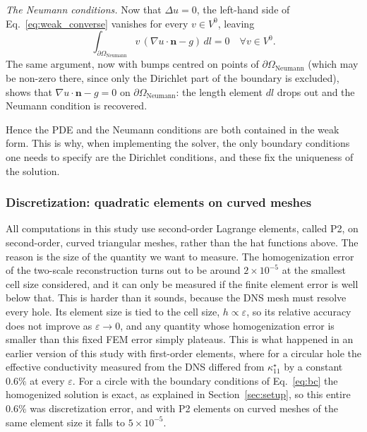 \documentclass{article}
\makeatletter
\providecommand\FloatBarrier{\par\begingroup\let\@elt\relax
  \edef\@tempa{\@botlist\@deferlist\@dbldeferlist}%
  \ifx\@tempa\@empty\else\clearpage\fi\endgroup}
\newcommand{\tmop}[1]{\ensuremath{\operatorname{#1}}}
\makeatother
\begin{document}
\emph{The Neumann conditions.} Now that $\Delta u = 0$, the left-hand side of
Eq.~\eqref{eq:weak_converse} vanishes for every $v \in V^0$, leaving
\[ \int_{\partial \Omega_{\tmop{Neumann}}} v \, (\nabla u \cdot \mathbf{n} - g) \,
   dl = 0 \quad \forall v \in V^0 . \]
The same argument, now with bumps centred on points of $\partial
\Omega_{\tmop{Neumann}}$ (which may be non-zero there, since only the Dirichlet
part of the boundary is excluded), shows that $\nabla u \cdot \mathbf{n} - g = 0$
on $\partial \Omega_{\tmop{Neumann}}$: the length element $dl$ drops out and the
Neumann condition is recovered.

Hence the PDE and the Neumann conditions are both contained in the weak form.
This is why, when implementing the solver, the only boundary conditions one
needs to specify are the Dirichlet conditions, and these fix the uniqueness of
the solution.

\FloatBarrier
\subsubsection{Discretization: quadratic elements on curved meshes}
\label{sec:p2}

All computations in this study use second-order Lagrange elements, called P2, on
second-order, curved triangular meshes, rather than the hat functions above.
The reason is the size of the quantity we want to measure. The homogenization
error of the two-scale reconstruction turns out to be around $2\times10^{-5}$ at
the smallest cell size considered, and it can only be measured if the finite element
error is well below that. This is harder than it sounds, because the DNS mesh must
resolve every hole. Its element size is tied to the cell size, $h \propto \varepsilon$,
so its relative accuracy does not improve as $\varepsilon \to 0$, and any quantity whose
homogenization error is smaller than this fixed FEM error simply plateaus. This is what
happened in an earlier version of this study with first-order elements, where for a
circular hole the effective conductivity measured from the DNS differed from
$\kappa^{\star}_{11}$ by a constant $0.6\%$ at every $\varepsilon$. For a circle with the
boundary conditions of Eq.~\eqref{eq:bc} the homogenized solution is exact, as explained
in Section~\ref{sec:setup}, so this entire $0.6\%$ was discretization error, and with P2
elements on curved meshes of the same element size it falls to $5\times10^{-5}$.
\end{document}
